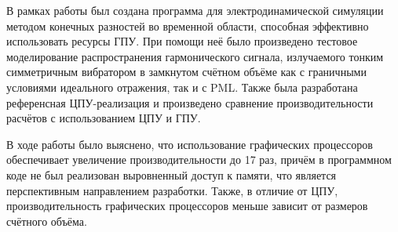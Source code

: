 
В рамках работы был создана программа для электродинамической симуляции методом конечных разностей во временной области,
способная эффективно использовать ресурсы ГПУ. При помощи неё было произведено тестовое моделирование распространения гармонического 
сигнала, излучаемого тонким симметричным вибратором в замкнутом счётном объёме как с граничными условиями идеального отражения, так и с PML. 
Также была разработана референсная ЦПУ-реализация и произведено сравнение 
производительности расчётов с использованием ЦПУ и ГПУ.

В ходе работы было выяснено, что использование графических процессоров 
обеспечивает увеличение производительности до 17 раз, причём в программном коде
не был реализован выровненный доступ к памяти, что является 
перспективным направлением разработки. Также, в отличие от ЦПУ, 
производительность графических процессоров меньше зависит от размеров счётного объёма.

\clearpage